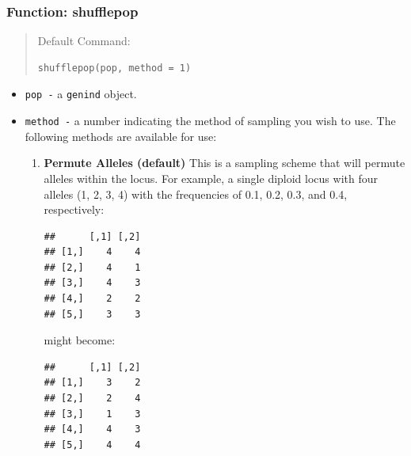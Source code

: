 \documentclass[letterpaper]{article}\usepackage[]{graphicx}\usepackage[]{color}
\makeatletter
\newenvironment{kframe}{%
 \def\at@end@of@kframe{}%
 \ifinner\ifhmode%
  \def\at@end@of@kframe{\end{minipage}}%
  \begin{minipage}{\columnwidth}%
 \fi\fi%
 \def\FrameCommand##1{\hskip\@totalleftmargin \hskip-\fboxsep
 \colorbox{shadecolor}{##1}\hskip-\fboxsep
     \hskip-\linewidth \hskip-\@totalleftmargin \hskip\columnwidth}%
 \MakeFramed {\advance\hsize-\width
   \@totalleftmargin\z@ \linewidth\hsize
   \@setminipage}}%
 {\par\unskip\endMakeFramed%
 \at@end@of@kframe}
\newenvironment{knitrout}{}{} %
\makeatother
\begin{document}
\subsubsection{Function: shufflepop}\label{data.manip:shuffle:shufflepop}
\begin{quote}
Default Command:
\begin{knitrout}
\color{fgcolor}\begin{kframe}
\begin{verbatim}
shufflepop(pop, method = 1)
\end{verbatim}
\end{kframe}
\end{knitrout}

\end{quote}
\begin{itemize}
  \item \texttt{pop -} a \texttt{genind} object.
  \item \texttt{method -} a number indicating the method of sampling you wish to use. 
  The following methods are available for use:
  \begin{enumerate}
    \item \textbf{Permute Alleles (default)} This is a sampling scheme that will permute alleles within the locus. For example, a single diploid locus with four alleles (1, 2, 3, 4) with the frequencies of 0.1, 0.2, 0.3, and 0.4, respectively:
\begin{knitrout}\footnotesize
{}\color{fgcolor}\begin{kframe}
\begin{verbatim}
##      [,1] [,2]
## [1,]    4    4
## [2,]    4    1
## [3,]    4    3
## [4,]    2    2
## [5,]    3    3
\end{verbatim}
\end{kframe}
\end{knitrout}

might become:
\begin{knitrout}\footnotesize
{}\color{fgcolor}\begin{kframe}
\begin{verbatim}
##      [,1] [,2]
## [1,]    3    2
## [2,]    2    4
## [3,]    1    3
## [4,]    4    3
## [5,]    4    4
\end{verbatim}
\end{kframe}
\end{knitrout}


\end{enumerate}
\end{itemize}
\end{document}
